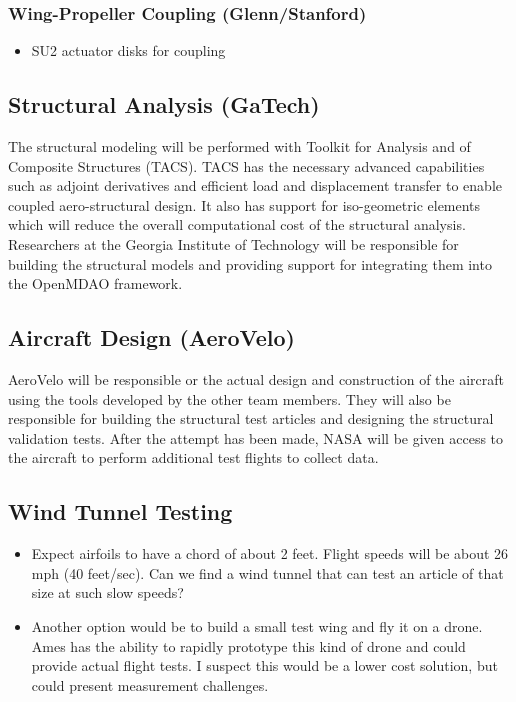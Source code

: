 \documentclass[]{aiaa-tc}
\begin{document}
    \subsubsection{Wing-Propeller Coupling (Glenn/Stanford)}
        \begin{itemize}
            \item SU2 actuator disks for coupling
        \end{itemize}

    \subsection{Structural Analysis (GaTech)}

    The structural modeling will be performed with Toolkit for Analysis and of Composite 
    Structures (TACS). TACS has the necessary advanced capabilities such as adjoint derivatives 
    and efficient load and displacement transfer to enable coupled aero­-structural design. It also has 
    support for iso-geometric elements which will reduce the overall computational cost of the 
    structural analysis. Researchers at the Georgia Institute of Technology will be responsible for 
    building the structural models and providing support for integrating them into the OpenMDAO framework. 

    \subsection{Aircraft Design (AeroVelo)}

    AeroVelo will be responsible or the actual design and construction of the aircraft using the tools developed 
    by the other team members. They will also be responsible for building the structural test articles and designing 
    the structural validation tests. After the attempt has been made, NASA will be given access to 
    the aircraft to perform additional test flights to collect data. 

    \subsection{Wind Tunnel Testing}
        \begin{itemize}
            \item Expect airfoils to have a chord of about 2 feet. Flight speeds will be about 26 mph (40 feet/sec). Can we find a wind tunnel 
            that can test an article of that size at such slow speeds? 
            \item Another option would be to build a small test wing and fly it on a drone. Ames has the ability to rapidly prototype this kind 
            of drone and could provide actual flight tests. I suspect this would be a lower cost solution, but could 
            present measurement challenges. 
        \end{itemize}
\end{document}
